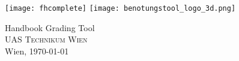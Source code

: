 



\begin{titlepage}
\begin{center}

\vfill \texttt{[image: fhcomplete]}
\vspace*{20mm}
\vfill \texttt{[image: benotungstool\_logo\_3d.png]}
\vspace*{10mm} 

\huge Handbook Grading Tool\\

	
\large \vfill \textsc{UAS Technikum Wien}\\

Wien, \today
\end{center}
\end{titlepage}